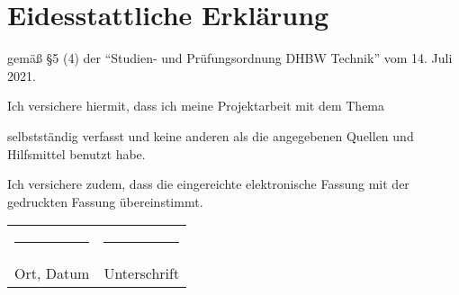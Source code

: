 \chapter*{Eidesstattliche Erklärung}
\begin{center}
gemäß \S 5 (4) der "`Studien- und Prüfungsordnung DHBW Technik"' vom 14. Juli 2021.
\vspace{\baselineskip}

Ich versichere hiermit, dass ich meine Projektarbeit mit dem Thema
\vspace{\baselineskip}

\textbf{\titel}

\vspace{\baselineskip}

selbstständig verfasst und keine anderen als die angegebenen Quellen und Hilfsmittel benutzt habe.
\vspace{\baselineskip}

Ich versichere zudem, dass die eingereichte elektronische Fassung mit der gedruckten Fassung übereinstimmt.

\vspace{3cm}

\begin{tabular}{p{7.5cm}p{7.5cm}}
\rule{6cm}{0.4pt} & \rule{6cm}{0.4pt}\\
Ort, Datum & Unterschrift\\

\end{tabular}
\end{center}